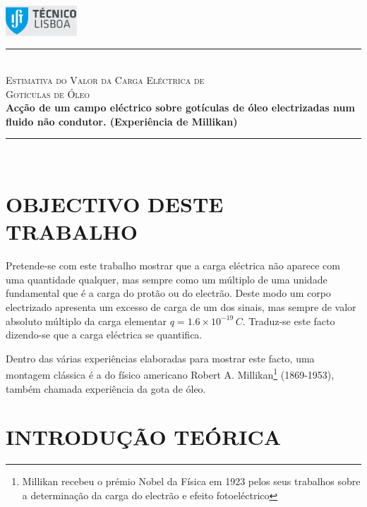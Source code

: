 \documentclass[a4paper,twoside,12pt]{article}      %
\author{Prof. Bernardo B. Carvalho}
\date{ Setembro 2012}
\newcommand{\HRule}{\rule{\linewidth}{0.5mm}}
\begin{document}
 

	\includegraphics[width=0.2\textwidth]{../logo-ist}%

		\HRule \\[0.5cm]
	{ \huge \sf  \textsc{Estimativa do Valor da Carga Eléctrica de \\
		Gotículas de Óleo} }\\[0.4cm] %
	{ \large \bfseries  
Acção de um campo eléctrico sobre gotículas de óleo electrizadas num fluido não 
condutor. (Experiência de Millikan)}\\
	\HRule \\%


\section{\sf OBJECTIVO DESTE TRABALHO}

Pretende-se com este trabalho mostrar que a carga eléctrica não aparece com uma quantidade qualquer, mas sempre como um múltiplo de uma unidade fundamental que é a carga do protão ou do electrão. Deste modo um corpo electrizado apresenta um excesso de carga de um dos sinais, mas sempre de valor absoluto múltiplo da carga elementar $q=1.6\times 10^{-19}\,C$.
Traduz-se este facto dizendo-se que a carga eléctrica se quantifica.

Dentro das várias experiências elaboradas para mostrar este facto, uma montagem clássica é a do físico americano Robert A. Millikan\footnote{Millikan recebeu o prémio Nobel da Física em 1923 pelos seus trabalhos sobre a determinação da carga do electrão e efeito fotoeléctrico } (1869-1953), também chamada experiência da gota de óleo.

\section{\sf INTRODUÇÃO TEÓRICA}
\end{document}
